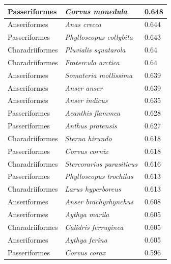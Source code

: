 \documentclass{article}
\begin{document}
\begin{longtable}{|p{} | p{} | p{} |}
  Passeriformes   & \textit{Corvus monedula}               & 0.648                \\ \hline
  Anseriformes    & \textit{Anas crecca}                   & 0.644                \\ \hline
  Passeriformes   & \textit{Phylloscopus collybita}        & 0.643                \\ \hline
  Charadriiformes & \textit{Pluvialis squatarola}          & 0.64                 \\ \hline
  Charadriiformes & \textit{Fratercula arctica}            & 0.64                 \\ \hline
  Anseriformes    & \textit{Somateria mollissima}          & 0.639                \\ \hline
  Anseriformes    & \textit{Anser anser}                   & 0.639                \\ \hline
  Anseriformes    & \textit{Anser indicus}                 & 0.635                \\ \hline
  Passeriformes   & \textit{Acanthis flammea}              & 0.628                \\ \hline
  Passeriformes   & \textit{Anthus pratensis}              & 0.627                \\ \hline
  Charadriiformes & \textit{Sterna hirundo}                & 0.618                \\ \hline
  Passeriformes   & \textit{Corvus cornix}                 & 0.618                \\ \hline
  Charadriiformes & \textit{Stercorarius parasiticus}      & 0.616                \\ \hline
  Passeriformes   & \textit{Phylloscopus trochilus}        & 0.613                \\ \hline
  Charadriiformes & \textit{Larus hyperboreus}             & 0.613                \\ \hline
  Anseriformes    & \textit{Anser brachyrhynchus}          & 0.608                \\ \hline
  Anseriformes    & \textit{Aythya marila}                 & 0.605                \\ \hline
  Charadriiformes & \textit{Calidris ferruginea}           & 0.605                \\ \hline
  Anseriformes    & \textit{Aythya ferina}                 & 0.605                \\ \hline
  Passeriformes   & \textit{Corvus corax}                  & 0.596                \\ \hline

\end{longtable}
\end{document}
